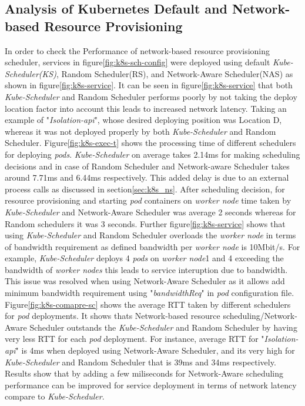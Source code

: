 \subsection{Analysis of Kubernetes Default and Network-based Resource Provisioning}
\label{sec:analysis}
In order to check the Performance of network-based resource provisioning scheduler, services in figure\ref{fig:k8s-sch-config} were deployed using default \emph{Kube-Scheduler(KS)}, Random Scheduler(RS), and Network-Aware Scheduler(NAS) as shown in figure\ref{fig:k8s-service}. It can be seen in figure\ref{fig:k8s-service} that both \emph{Kube-Scheduler} and Random Scheduler performs poorly by not taking the deploy location factor into account this leads to increased network latency\cite{Santos2019}. Taking an example of "\emph{Isolation-api}", whose desired deploying position was Location D, whereas it was not deployed properly by both \emph{Kube-Scheduler} and Random Scheduler\cite{Santos2019}. Figure\ref{fig:k8s-exec-t} shows the processing time of different schedulers for deploying \emph{pods}. \emph{Kube-Scheduler} on average takes 2.14ms for making scheduling decisions and in case of Random Scheduler and Network-aware Scheduler takes around 7.71ms and 6.44ms respectively\cite{Santos2019}. This added delay is due to an external process calls as discussed in section\ref{sec:k8s_ns}. After scheduling decision, for resource provisioning and starting \emph{pod} containers on \emph{worker node} time taken by \emph{Kube-Scheduler} and Network-Aware Scheduler was average 2 seconds whereas for Random schedulers it was 3 seconds\cite{Santos2019}. Further figure\ref{fig:k8s-service} shows that using \emph{Kube-Scheduler} and Random Scheduler overloads the \emph{worker node} in terms of bandwidth requirement as defined bandwidth per \emph{worker node} is 10Mbit/s\cite{Santos2019}. For example, \emph{Kube-Scheduler} deploys 4 \emph{pods} on \emph{worker node}1 and 4 exceeding the bandwidth of \emph{worker nodes} this leads to service interuption due to bandwidth\cite{Santos2019}. This issue was resolved when using Network-Aware Scheduler as it allows add minimum bandwidth requirement using "\emph{bandwidthReq}" in \emph{pod} configuration file. Figure\ref{fig:k8s-comapre-sc} shows the average RTT taken by different schedulers for \emph{pod} deployments. It shows thats Network-based resource scheduling/Network-Aware Scheduler outstands the \emph{Kube-Scheduler} and Random Scheduler by having very less RTT for each \emph{pod} deployment\cite{Santos2019}. For instance, average RTT for "\emph{Isolation-api}" is 4ms when deployed using Network-Aware Scheduler, and its very high for \emph{Kube-Scheduler} and Random Scheduler that is 39ms and 34ms respectively\cite{Santos2019}. Results show that by adding a few miliseconds for Network-Aware scheduling performance can be improved for service deployment in terms of network latency compare to \emph{Kube-Scheduler}\cite{Santos2019}.

